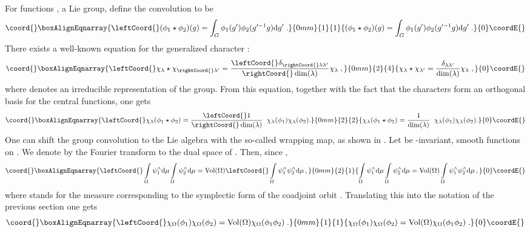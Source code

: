 \documentclass[a4paper,twoside,11pt]{article}
\numberwithin{equation}{section}
\begin{document}
For functions \coordHE{}, \coordHE{} a Lie group, define the convolution to be
\begin{gather}\coord{}\boxAlignEqnarray{
\leftCoord{}(\phi_1\star\phi_2)(g)=\int_G\phi_1(g^\prime)\phi_2(g^{\prime -1}g)\rd g'\;.
}{0mm}{1}{1}{
(\phi_1\star\phi_2)(g)=\int_G\phi_1(g^\prime)\phi_2(g^{\prime -1}g)\rd g'\;.
}{0}\coordE{}\end{gather}
There exists a well-known equation for the generalized character \cite{WL} :
\begin{gather}\coord{}\boxAlignEqnarray{
\leftCoord{}\chi_\lambda\star\chi_{\rightCoord{}\lambda^\prime}=\frac{\leftCoord{}\delta_{\rightCoord{}\lambda\lambda^\prime}}{\rightCoord{}\dim(\lambda)}\chi_\lambda\;,
}{0mm}{2}{4}{
\chi_\lambda\star\chi_{\lambda^\prime}=\frac{\delta_{\lambda\lambda^\prime}}{\dim(\lambda)}\chi_\lambda\;,
}{0}\coordE{}\end{gather}
where \myHighlight{$\lambda$}\coordHE{} denotes an irreducible representation of the group. From this equation, together with the fact that the characters form an orthogonal basis for the central 
functions, one gets
\begin{gather}\coord{}\boxAlignEqnarray{
\leftCoord{}\chi_\lambda(\phi_1\star\phi_2)=\frac{\leftCoord{}1}{\rightCoord{}\dim(\lambda)}\;\;\chi_\lambda(\phi_1)\chi_\lambda(\phi_2).
}{0mm}{2}{2}{
\chi_\lambda(\phi_1\star\phi_2)=\frac{1}{\dim(\lambda)}\;\;\chi_\lambda(\phi_1)\chi_\lambda(\phi_2).
}{0}\coordE{}\end{gather}
One can shift the group convolution to the Lie algebra with the so-called 
wrapping map, as shown in \cite{DW}. Let \coordHE{} be \coordHE{}-invariant, smooth functions on \coordHE{}. We denote by \myHighlight{$\psi^\wedge$}\coordHE{}  the Fourier transform to the dual space of \coordHE{}. Then, since 
\myHighlight{$\int_{\Omega_\lambda}\rd\mu=\dim(\lambda)$}\coordHE{}, 
\begin{gather}\coord{}\boxAlignEqnarray{
\leftCoord{}\int\limits_\Omega\psi_1^\wedge\rd\mu\int\limits_\Omega\psi_2^\wedge\rd\mu=\Vol(\Omega)
\leftCoord{}\int\limits_\Omega\psi_1^\wedge\psi_2^\wedge\rd\mu\,,
}{0mm}{2}{1}{
\int\limits_\Omega\psi_1^\wedge\rd\mu\int\limits_\Omega\psi_2^\wedge\rd\mu=\Vol(\Omega)
\int\limits_\Omega\psi_1^\wedge\psi_2^\wedge\rd\mu\,,
}{0}\coordE{}\end{gather}
where \myHighlight{$\rd\mu$}\coordHE{} stands for the measure corresponding to the symplectic form of the coadjoint orbit \myHighlight{$\Omega$}\coordHE{}. 
Translating this into the notation of the previous section one gets
\begin{gather}\coord{}\boxAlignEqnarray{
\leftCoord{}\chi_\Omega(\phi_1)\chi_\Omega(\phi_2)=\Vol(\Omega)\chi_\Omega(\phi_1\phi_2)\;.
\label{ident}}{0mm}{1}{1}{
\chi_\Omega(\phi_1)\chi_\Omega(\phi_2)=\Vol(\Omega)\chi_\Omega(\phi_1\phi_2)\;.
}{0}\coordE{}\end{gather}
\end{document}
